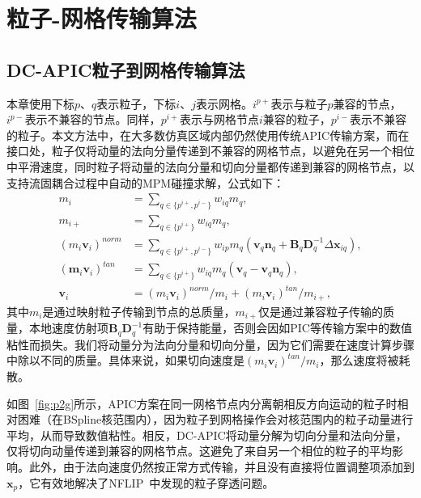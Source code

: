 
\section{粒子-网格传输算法}
\subsection{DC-APIC粒子到网格传输算法}
\label{sec:DC-APIC_p2g}
本章使用下标$p$、$q$表示粒子，下标$i$、$j$表示网格。$i^{p+}$表示与粒子$p$兼容的节点，$i^{p-}$表示不兼容的节点。同样，$p^{i+}$表示与网格节点$i$兼容的粒子，$p^{i-}$表示不兼容的粒子。本文方法中，在大多数仿真区域内部仍然使用传统APIC传输方案，而在接口处，粒子仅将动量的法向分量传递到不兼容的网格节点，以避免在另一个相位中平滑速度，同时粒子将动量的法向分量和切向分量都传递到兼容的网格节点，以支持流固耦合过程中自动的MPM碰撞求解，公式如下：
\begin{equation}
    \label{eq:DCAPIC_p2g}
\begin{aligned}
    m_i &= \sum_{q\in\{p^{i+},p^{i-}\}}w_{iq}m_q, \\
    m_{i+} &= \sum_{q\in\{p^{i+}\}}w_{iq}m_q, \\
    (m_i\mathbf{v}_i)^{norm} &=\sum_{q\in\{p^{i+},p^{i-}\}}w_{ip}m_q(\mathbf{v}_q\mathbf{n}_q + \mathbf{B}_q\mathbf{D}_q^{-1}\Delta\mathbf{x}_{iq}), \\
    (\mathbf{m}_i\mathbf{v}_i)^{tan} &=\sum_{q\in\{p^{i+}\}}w_{iq}m_q(\mathbf{v}_q - \mathbf{v}_q\mathbf{n}_q), \\
    \mathbf{v}_i &=(m_i\mathbf{v}_i)^{norm}/m_i+(m_i\mathbf{v}_i)^{tan}/m_{i+},
\end{aligned}
\end{equation}
其中$m_i$是通过映射粒子传输到节点的总质量，$m_{i+}$仅是通过兼容粒子传输的质量，本地速度仿射项$\mathbf{B}_q\mathbf{D}_q^{-1}$有助于保持能量，否则会因如PIC等传输方案中的数值粘性而损失。我们将动量分为法向分量和切向分量，因为它们需要在速度计算步骤中除以不同的质量。具体来说，如果切向速度是$(m_i\mathbf{v}_i)^{tan}/m_i$，那么速度将被耗散。

如图~\ref{fig:p2g}所示，APIC方案在同一网格节点内分离朝相反方向运动的粒子时相对困难（在BSpline核范围内），因为粒子到网格操作会对核范围内的粒子动量进行平均，从而导致数值粘性。相反，DC-APIC将动量分解为切向分量和法向分量，仅将切向动量传递到兼容的网格节点。这避免了来自另一个相位的粒子的平均影响。此外，由于法向速度仍然按正常方式传输，并且没有直接将位置调整项添加到$\mathbf{x}_p$，它有效地解决了NFLIP~\cite{stomakhin2013material}中发现的粒子穿透问题。

